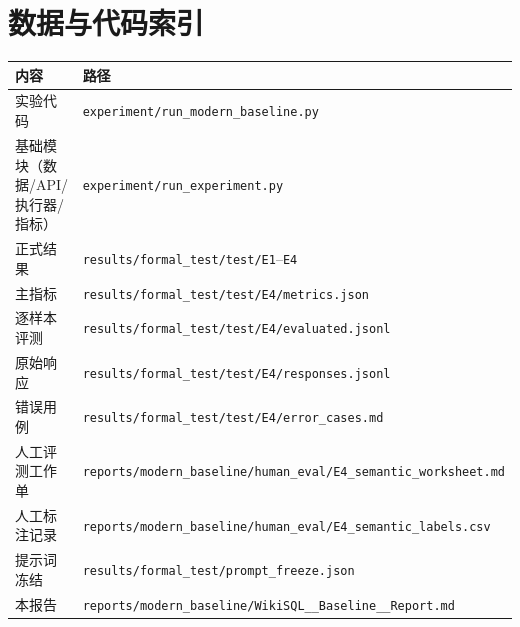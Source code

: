 \documentclass[conference]{IEEEtran}
\begin{document}
\section{数据与代码索引}
\needspace{4.9cm}
\noindent\begin{minipage}{\linewidth}
\centering
\scriptsize
\begin{tabular}{@{}>{\raggedright\arraybackslash}p{3.24cm}>{\raggedright\arraybackslash}p{4.16cm}@{}}
\toprule
内容 & 路径 \\
\midrule
实验代码 & \texttt{experiment/\allowbreak{}run\_modern\_baseline.py} \\
基础模块（数据/API/执行器/指标） & \texttt{experiment/\allowbreak{}run\_experiment.py} \\
正式结果 & \texttt{results/\allowbreak{}formal\_test/\allowbreak{}test/\allowbreak{}E1}–\texttt{E4} \\
主指标 & \texttt{results/\allowbreak{}formal\_test/\allowbreak{}test/\allowbreak{}E4/\allowbreak{}metrics.json} \\
逐样本评测 & \texttt{results/\allowbreak{}formal\_test/\allowbreak{}test/\allowbreak{}E4/\allowbreak{}evaluated.jsonl} \\
原始响应 & \texttt{results/\allowbreak{}formal\_test/\allowbreak{}test/\allowbreak{}E4/\allowbreak{}responses.jsonl} \\
错误用例 & \texttt{results/\allowbreak{}formal\_test/\allowbreak{}test/\allowbreak{}E4/\allowbreak{}error\_cases.md} \\
人工评测工作单 & \texttt{reports/\allowbreak{}modern\_baseline/\allowbreak{}human\_eval/\allowbreak{}E4\_semantic\_worksheet.md} \\
人工标注记录 & \texttt{reports/\allowbreak{}modern\_baseline/\allowbreak{}human\_eval/\allowbreak{}E4\_semantic\_labels.csv} \\
提示词冻结 & \texttt{results/\allowbreak{}formal\_test/\allowbreak{}prompt\_freeze.json} \\
本报告 & \texttt{reports/\allowbreak{}modern\_baseline/\allowbreak{}WikiSQL\_\_Baseline\_\_Report.md} \\
\bottomrule
\end{tabular}
\end{minipage}\par\smallskip
\needspace{6cm}
\end{document}
